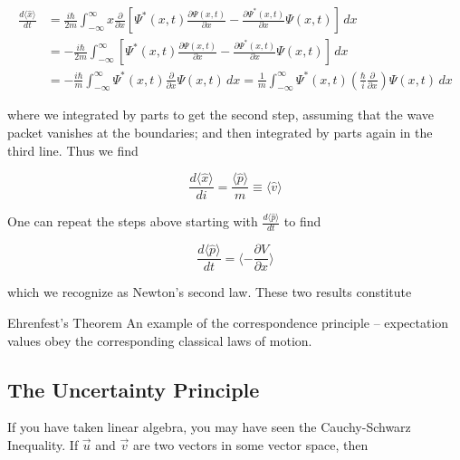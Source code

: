 \begin{align*}
  \frac{d \langle \hat{x} \rangle }{d t} &= \frac{i\hbar}{2m}
  \int_{-\infty}^{\infty} x \frac{\partial }{\partial x}  \left[ \Psi^*(x, t)
    \frac{\partial \Psi(x, t)}{\partial x}  - \frac{\partial \Psi^*(x,
  t)}{\partial x} \Psi(x, t) \right] \, dx \\ 
  &= -\frac{i\hbar}{2m}\int_{-\infty}^{\infty} \left[ \Psi^*(x, t)
  \frac{\partial \Psi(x, t)}{\partial x}  - \frac{\partial \Psi^*(x,
t)}{\partial x} \Psi(x, t) \right] \, dx \\ 
  &= -\frac{i\hbar}{m} \int_{-\infty}^{\infty} \Psi^*(x, t) \frac{\partial
  }{\partial x} \Psi(x, t) \, dx = \frac{1}{m} \int_{-\infty}^{\infty}
  \Psi^*(x, t) \left( \frac{\hbar}{i} \frac{\partial }{\partial x}  \right)
  \Psi(x, t) \, dx
\end{align*}\vspace{3px}

where we integrated by parts to get the second step, assuming that the wave
packet vanishes at the boundaries; and then integrated by parts again in the
third line. Thus we find 

\[
\frac{d \langle \hat{x} \rangle }{d i}  = \frac{\langle \hat{p} \rangle }{m}
\equiv \langle \hat{v} \rangle 
\] \vspace{3px}

One can repeat the steps above starting with  $ \frac{d \langle \hat{p} \rangle
}{d t} $ to find 

\[
\frac{d \langle \hat{p} \rangle }{d t} = \langle - \frac{\partial V}{\partial x}  \rangle 
\] \vspace{3px}

which we recognize as Newton's second law. These two results constitute 
\vspace{3px}
\begin{mainbox}{Ehrenfest's Theorem}
  An example of the correspondence principle -- expectation values obey the
  corresponding classical laws of motion. 
\end{mainbox}
\vspace{3px}

\subsection{The Uncertainty Principle}  

If you have taken linear algebra, you may have seen the Cauchy-Schwarz
Inequality. If $\vec{u}$ and $\vec{v}$ are two vectors in some vector space,
then 

